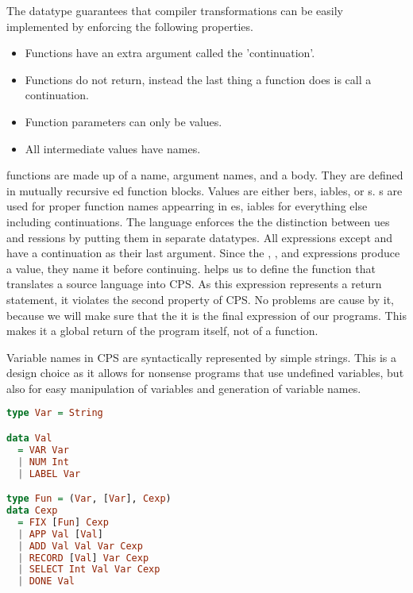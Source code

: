 The  datatype guarantees that compiler transformations can be easily implemented by enforcing the following properties.

\begin{itemize}
\item Functions have an extra argument called the 'continuation'.
\item Functions do not return, instead the last thing a function does is call a continuation.
\item Function parameters can only be values.
\item All intermediate values have names.
\end{itemize}

 functions are made up of a name, argument names, and a body. They are defined in mutually recursive ed function blocks. Values are either bers, iables, or s. s are used for proper function names appearring in es, iables for everything else including continuations. The  language enforces the the distinction between ues and ressions by putting them in separate datatypes. All expressions except  and  have a continuation as their last argument. Since the , , and  expressions produce a value, they name it before continuing.  helps us to define the function that translates a source language into \ac{CPS}. As this expression represents a return statement, it violates the second property of \ac{CPS}. No problems are cause by it, because we will make sure that the it is the final expression of our programs. This makes it a global return of the program itself, not of a function.

Variable names in \ac{CPS} are syntactically represented by simple strings. This is a design choice as it allows for nonsense programs that use undefined variables, but also for easy manipulation of variables and generation of variable names.

\begin{lstlisting}[language=Haskell]
type Var = String

data Val
  = VAR Var
  | NUM Int
  | LABEL Var

type Fun = (Var, [Var], Cexp)
data Cexp
  = FIX [Fun] Cexp
  | APP Val [Val]
  | ADD Val Val Var Cexp
  | RECORD [Val] Var Cexp
  | SELECT Int Val Var Cexp
  | DONE Val
\end{lstlisting}

